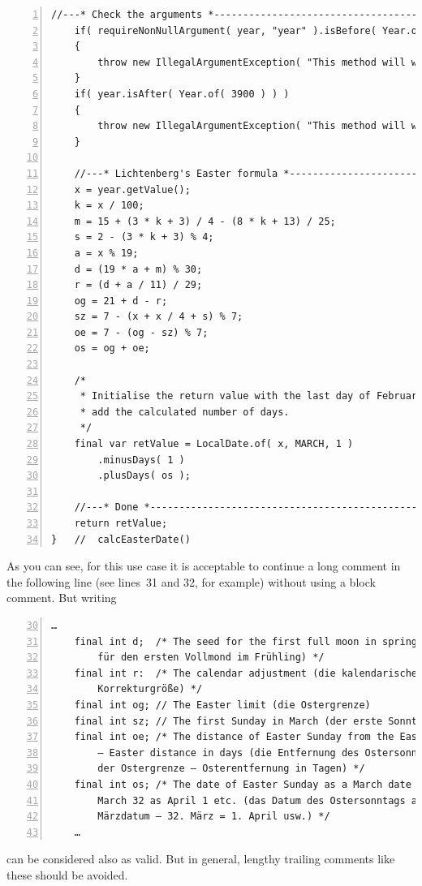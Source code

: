 \documentclass[11pt,a4paper, titlepage, parskip=half, headsepline, footsepline, cleardoublepage=current, headheight=1cm]{scrbook}
\begin{document}
\begin{lstlisting}[numbers=left,caption={Gauss' Easter algorithm\autocite{WIKIPEDIA:DateOfEaster,WIKIPEDIA:Gaussche_Osterformel}},label={listing:GaussEaster}]
    //---* Check the arguments *-------------------------------------    
    if( requireNonNullArgument( year, "year" ).isBefore( Year.of( 1583 ) ) )
    {
        throw new IllegalArgumentException( "This method will work only for years greater than or equal to 1583" );
    }
    if( year.isAfter( Year.of( 3900 ) ) )
    {
        throw new IllegalArgumentException( "This method will work only for years less than or equal to 3900" );
    }

    //---* Lichtenberg's Easter formula *----------------------------
    x = year.getValue();
    k = x / 100;    
    m = 15 + (3 * k + 3) / 4 - (8 * k + 13) / 25;
    s = 2 - (3 * k + 3) % 4;
    a = x % 19;
    d = (19 * a + m) % 30;
    r = (d + a / 11) / 29;
    og = 21 + d - r;
    sz = 7 - (x + x / 4 + s) % 7;
    oe = 7 - (og - sz) % 7;
    os = og + oe;

    /*
     * Initialise the return value with the last day of February and 
     * add the calculated number of days.
     */
    final var retValue = LocalDate.of( x, MARCH, 1 )
        .minusDays( 1 )
        .plusDays( os );

    //---* Done *----------------------------------------------------
    return retValue;
}   //  calcEasterDate()
\end{lstlisting}

As you can see, for this use case it is acceptable to continue a long comment in the following line (see lines~31 and 32, for example) without using a block comment. But writing
\begin{lstlisting}[numbers=left,firstnumber=30]
    …
    final int d;  /* The seed for the first full moon in spring (der Keim 
        für den ersten Vollmond im Frühling) */
    final int r:  /* The calendar adjustment (die kalendarische
        Korrekturgröße) */
    final int og; // The Easter limit (die Ostergrenze)
    final int sz; // The first Sunday in March (der erste Sonntag im März)
    final int oe; /* The distance of Easter Sunday from the Easter limit
        – Easter distance in days (die Entfernung des Ostersonntags von 
        der Ostergrenze – Osterentfernung in Tagen) */
    final int os; /* The date of Easter Sunday as a March date with 
        March 32 as April 1 etc. (das Datum des Ostersonntags als 
        Märzdatum – 32. März = 1. April usw.) */
    …    
\end{lstlisting}
can be considered also as valid. But in general, lengthy trailing comments like these should be avoided.
\end{document}
